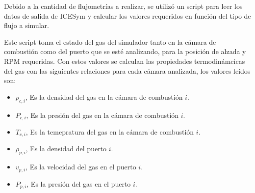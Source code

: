 

Debido a la cantidad de flujometrías a realizar, se utilizó un script para leer
los datos de salida de ICESym y calcular los valores requeridos en función del
tipo de flujo a simular.

Este script toma el estado del gas del simulador tanto en la cámara de
combustión como del puerto que se esté analizando, para la posición de alzada y
RPM requeridas.
%
Con estos valores se calculan las propiedades termodinámcicas del gas con las
siguientes relaciones para cada cámara analizada, los valores leídos son:

\begin{itemize}
    \item $\rho_{c,i}$, Es la densidad del gas en la cámara de combustión $i$.
    \item $P_{c,i}$, Es la presión del gas en la cámara de combustión $i$.
    \item $T_{c,i}$, Es la temepratura del gas en la cámara de combustión $i$.
    \item $\rho_{p,i}$, Es la densidad del puerto $i$.
    \item $v_{p,i}$, Es la velocidad del gas en el puerto $i$.
    \item $P_{p,i}$, Es la presión del gas en el puerto $i$.
\end{itemize}

